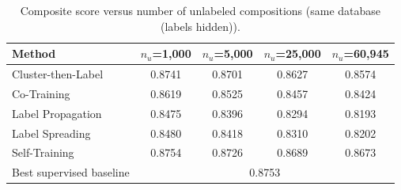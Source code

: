 \begin{table}[H]
\centering\small
\begin{tabular}{lcccc}
\toprule
Method & $n_u$=1,000 & $n_u$=5,000 & $n_u$=25,000 & $n_u$=60,945\\
\midrule
Cluster-then-Label & 0.8741 & 0.8701 & 0.8627 & 0.8574 \\
Co-Training & 0.8619 & 0.8525 & 0.8457 & 0.8424 \\
Label Propagation & 0.8475 & 0.8396 & 0.8294 & 0.8193 \\
Label Spreading & 0.8480 & 0.8418 & 0.8310 & 0.8202 \\
Self-Training & 0.8754 & 0.8726 & 0.8689 & 0.8673 \\
\midrule
Best supervised baseline & \multicolumn{4}{c}{0.8753}\\
\bottomrule
\end{tabular}
\caption*{Composite score versus number of unlabeled compositions (same database (labels hidden)).}
\end{table}
